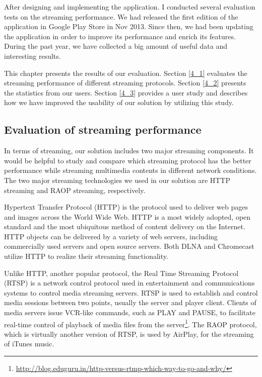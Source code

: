 
After designing and implementing the application. I conducted several
evaluation tests on the streaming performance. We had released the first
edition of the application in Google Play Store in Nov 2013. Since then, we had
been updating the application in order to improve its performance and enrich
its features. During the past year, we have collected a big amount of
useful data and interesting results.

This chapter presents the results of our evaluation. Section \ref{4_1} evaluates
the streaming performance of different streaming protocols. Section \ref{4_2}
presents the statistics from our users. Section \ref{4_3} provides a user study
and describes how we have improved the usability of our solution by utilizing
this study.
\subsection{Evaluation of streaming performance\label{4_1}}
In terms of streaming, our solution includes two major streaming components. It
would be helpful to study and compare which streaming protocol has the better
performance while streaming multimedia contents in different network conditions.
The two major streaming technologies we used in our solution are HTTP streaming
and RAOP streaming, respectively.

Hypertext Transfer Protocol (HTTP) \cite{http_rfc} is the protocol used to
deliver web pages and images across the World Wide Web. HTTP is a most widely adopted, open
standard and the most ubiquitous method of content delivery on the Internet.
HTTP objects can be delivered by a variety of web servers, including
commercially used servers and open source
servers. Both DLNA and Chromecast utilize HTTP to realize their streaming
functionality.

Unlike HTTP, another popular protocol, the Real Time Streaming Protocol (RTSP)
\cite{rtsp_rfc} is a network control protocol used in entertainment and
communications systems to control media streaming servers. RTSP is used to establish and control media
sessions between two points, usually the server and player client. Clients of
media servers issue VCR-like commands, such as PLAY and PAUSE, to facilitate
real-time control of playback of media files from the
server\footnote{\url{http://blog.eduguru.in/http-versus-rtmp-which-way-to-go-and-why/}}.
The RAOP protocol, which is virtually another version of RTSP, is used by AirPlay, for
the streaming of iTunes music.

